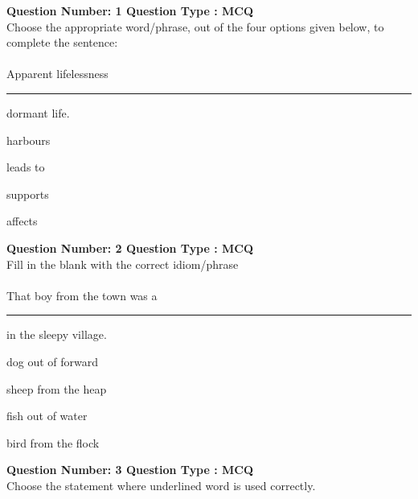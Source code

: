 \iffalse
    \title{Assignment}
    \author{EE24BTECH11063}
    \section{ce}
    \chapter{2012}
  \fi

\item \textbf{Question Number: 1 Question Type : MCQ}\\
Choose the appropriate word/phrase, out of the four options given below, to complete the sentence:\\
\\
Apparent lifelessness \rule{1cm}{0.15mm} dormant life.
\begin{enumerate}
    \begin{multicols}{4}
        \item harbours
        \item leads to
        \item supports
        \item affects
    \end{multicols}
\end{enumerate}
\bigskip
\item \textbf{Question Number: 2 Question Type : MCQ}\\
Fill in the blank with the correct idiom/phrase\\
\\
That boy from the town was a \rule{1cm}{0.15mm} in the sleepy village.
\begin{enumerate}
    \begin{multicols}{2}
        \item dog out of forward
        \columnbreak
        \item sheep from the heap
    \end{multicols}
    \begin{multicols}{2}
        \item fish out of water
        \item bird from the flock
    \end{multicols}
\end{enumerate}
\bigskip
\item \textbf{Question Number: 3 Question Type : MCQ}\\
 Choose the statement where underlined word is used correctly. \\

